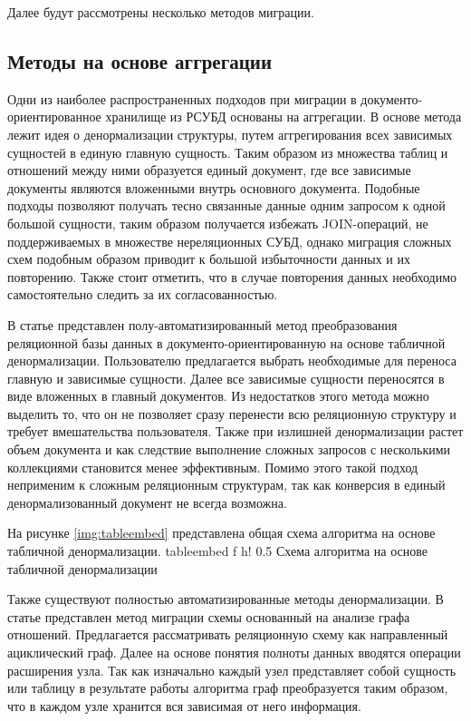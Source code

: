 Далее будут рассмотрены несколько методов миграции.
\subsection{Методы на основе аггрегации}
Одни из наиболее распространенных подходов при миграции в документо-ориентированное хранилище из РСУБД основаны на аггрегации.
В основе метода лежит идея о денормализации структуры, путем аггрегирования всех зависимых сущностей в единую главную сущность.
Таким образом из множества таблиц и отношений между ними образуется единый документ, где все зависимые документы являются вложенными внутрь основного документа.
Подобные подходы позволяют получать тесно связанные данные одним запросом к одной большой сущности,
таким образом получается избежать JOIN-операций, не поддерживаемых в множестве нереляционных СУБД,
однако миграция сложных схем подобным образом приводит к большой избыточности данных и их повторению.
Также стоит отметить, что в случае повторения данных необходимо самостоятельно следить за их согласованностью.

В статье \cite{embedding} представлен полу-автоматизированный метод преобразования реляционной базы данных в документо-ориентированную на основе табличной денормализации.
Пользователю предлагается выбрать необходимые для переноса главную и зависимые сущности. 
Далее все зависимые сущности переносятся в виде вложенных в главный документов.
Из недостатков этого метода можно выделить то, что он не позволяет сразу перенести всю реляционную структуру и требует вмешательства пользователя.
Также при излишней денормализации растет объем документа и как следствие выполнение сложных запросов с несколькими коллекциями становится менее эффективным.
Помимо этого такой подход неприменим к сложным реляционным структурам, так как конверсия в единый денормализованный документ не всегда возможна.

На рисунке \ref{img:tableembed} представлена общая схема алгоритма на основе табличной денормализации.
    {tableembed} %
    {f} %
    {h!} %
    {0.5\textwidth} %
    {Схема алгоритма на основе табличной денормализации} %

\clearpage

Также существуют полностью автоматизированные методы денормализации.
В статье \cite{graphmethod} представлен метод миграции схемы основанный на анализе графа отношений.
Предлагается рассматривать реляционную схему как направленный ациклический граф.
Далее на основе понятия полноты данных вводятся операции расширения узла.
Так как изначально каждый узел представляет собой сущность или таблицу в результате работы алгоритма граф преобразуется таким образом, что в каждом узле хранится вся зависимая от него информация.

